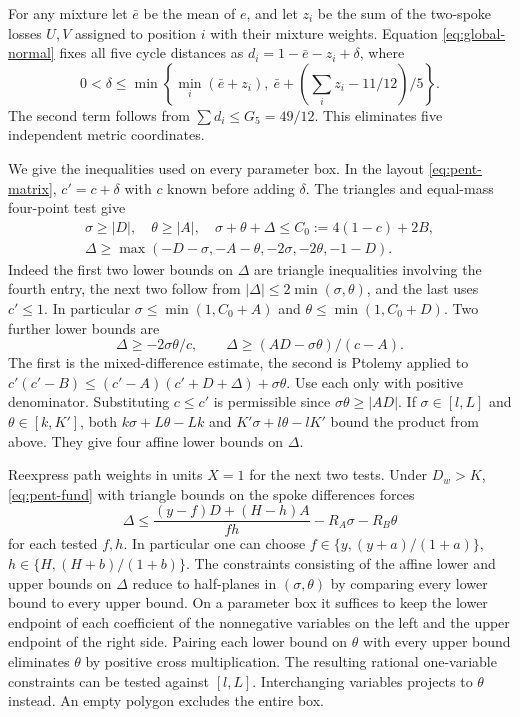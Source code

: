 \documentclass[11pt,a4paper]{article}
\theoremstyle{definition}
\begin{document}
For any mixture let $\bar e$ be the mean of $e$, and let $z_i$ be the
sum of the two-spoke losses $U,V$ assigned to position $i$ with their
mixture weights. Equation \eqref{eq:global-normal} fixes all five cycle
distances as $d_i=1-\bar e-z_i+\delta$, where
\begin{equation}\label{eq:pent-drift}
 0<\delta\le\min\left\{\min_i(\bar e+z_i),\
                  \bar e+(\sum_i z_i-11/12)/5\right\}.
\end{equation}
The second term follows from $\sum d_i\le G_5=49/12$.
This eliminates five independent metric coordinates.

We give the inequalities used on every parameter box. In the layout
\eqref{eq:pent-matrix}, $c'=c+\delta$ with $c$ known before adding
$\delta$. The triangles and equal-mass four-point test give
\[
 \begin{gathered}
 \sigma\ge|D|,\quad\theta\ge|A|,\quad
 \sigma+\theta+\Delta\le C_0:=4(1-c)+2B,\\
 \Delta\ge\max(-D-\sigma,-A-\theta,-2\sigma,-2\theta,-1-D).
 \end{gathered}
\]
Indeed the first two lower bounds on $\Delta$ are triangle inequalities
involving the fourth entry, the next two follow from
$|\Delta|\le2\min(\sigma,\theta)$, and the last uses $c'\le1$.
In particular $\sigma\le\min(1,C_0+A)$ and
$\theta\le\min(1,C_0+D)$. Two further lower bounds are
\[
 \Delta\ge-2\sigma\theta/c,\qquad
 \Delta\ge(AD-\sigma\theta)/(c-A).
\]
The first is the mixed-difference estimate, the second is Ptolemy applied
to $c'(c'-B)\le(c'-A)(c'+D+\Delta)+\sigma\theta$. Use each only with
positive denominator. Substituting $c\le c'$ is permissible since
$\sigma\theta\ge|AD|$. If $\sigma\in[l,L]$ and $\theta\in[k,K']$,
both $k\sigma+L\theta-Lk$ and $K'\sigma+l\theta-lK'$ bound the product
from above. They give four affine lower bounds on $\Delta$.

Reexpress path weights in units $X=1$ for the next two tests. Under
$D_w>K$, \eqref{eq:pent-fund} with triangle bounds on the spoke
differences forces
\begin{equation}\label{eq:pent-half}
 \Delta\le\frac{(y-f)D+(H-h)A}{fh}-R_A\sigma-R_B\theta
\end{equation}
for each tested $f,h$. In particular one can choose
$f\in\{y,(y+a)/(1+a)\}$, $h\in\{H,(H+b)/(1+b)\}$.
The constraints consisting of the affine lower and upper bounds on
$\Delta$ reduce to half-planes in $(\sigma,\theta)$ by comparing every
lower bound to every upper bound. On a parameter box it suffices to keep
the lower endpoint of each coefficient of the nonnegative variables on
the left and the upper endpoint of the right side. Pairing each lower
bound on $\theta$ with every upper bound eliminates $\theta$ by positive
cross multiplication. The resulting rational one-variable constraints
can be tested against $[l,L]$. Interchanging variables projects to
$\theta$ instead. An empty polygon excludes the entire box.
\end{document}
